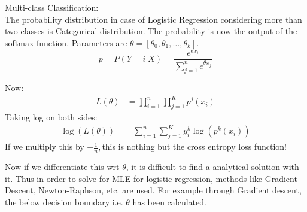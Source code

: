 \documentclass[handout]{beamer}
\begin{document}
\begin{frame}







Multi-class Classification:\\
The probability distribution in case of Logistic Regression considering more than two classes is Categorical distribution. The probability is now the output of the softmax function.
Parameters are $\theta=[\theta_0,\theta_1,\ldots, \theta_k]$.
\begin{equation}
p = P(Y=i|X) = \frac{e^{\theta x_i}}{\sum_{j=1}^ne^{\theta x_j}}
\end{equation}


\end{frame}
\begin{frame}
Now:
\begin{align*}
    L(\theta)&= \prod_{i=1}^n\prod_{j=1}^K p^j(x_i)
\end{align*}
Taking log on both sides:\\
\begin{align*}
    \log(L(\theta)) &= \sum_{i=1}^n\sum_{j=1}^K y_i^k\log(p^k(x_i))
\end{align*}
If we multiply this by $-\frac{1}{n},$this is nothing but the cross entropy loss function!



\end{frame}
\begin{frame}
    Now if we differentiate this wrt $\theta$, it is difficult to find a analytical solution with it.
    Thus in order to solve for MLE for logistic regression, methods like Gradient Descent, Newton-Raphson, etc. are used. For example through Gradient descent, the below decision boundary i.e. $\theta$ has been calculated.
    
\end{frame}
\end{document}
